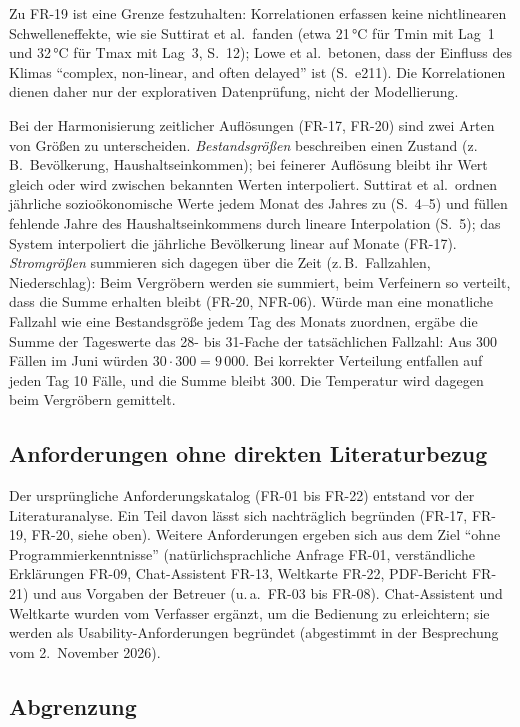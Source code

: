 \documentclass[11pt,a4paper]{article}
\begin{document}
\noindent Zu FR-19 ist eine Grenze festzuhalten: Korrelationen erfassen keine
nichtlinearen Schwelleneffekte, wie sie Suttirat et al.\ fanden (etwa
21\,°C für Tmin mit Lag~1 und 32\,°C für Tmax mit Lag~3, S.~12); Lowe et al.\
betonen, dass der Einfluss des Klimas \enquote{complex, non-linear, and often
delayed} ist (S.~e211). Die Korrelationen dienen daher nur der explorativen
Datenprüfung, nicht der Modellierung.

\noindent Bei der Harmonisierung zeitlicher Auflösungen (FR-17, FR-20) sind zwei
Arten von Größen zu unterscheiden. \emph{Bestandsgrößen} beschreiben einen Zustand
(z.\,B.\ Bevölkerung, Haushaltseinkommen); bei feinerer Auflösung bleibt ihr Wert
gleich oder wird zwischen bekannten Werten interpoliert. Suttirat et al.\ ordnen
jährliche sozioökonomische Werte jedem Monat des Jahres zu (S.~4--5) und füllen
fehlende Jahre des Haushaltseinkommens durch lineare Interpolation (S.~5); das
System interpoliert die jährliche Bevölkerung linear auf Monate (FR-17).
\emph{Stromgrößen} summieren sich dagegen über die Zeit (z.\,B.\ Fallzahlen,
Niederschlag): Beim Vergröbern werden sie summiert, beim Verfeinern so verteilt,
dass die Summe erhalten bleibt (FR-20, NFR-06). Würde man eine monatliche Fallzahl
wie eine Bestandsgröße jedem Tag des Monats zuordnen, ergäbe die Summe der
Tageswerte das 28- bis 31-Fache der tatsächlichen Fallzahl: Aus 300 Fällen im Juni
würden $30 \cdot 300 = 9\,000$. Bei korrekter Verteilung entfallen auf jeden Tag
10 Fälle, und die Summe bleibt 300. Die Temperatur wird dagegen beim Vergröbern
gemittelt.

\subsection{Anforderungen ohne direkten Literaturbezug}

Der ursprüngliche Anforderungskatalog (FR-01 bis FR-22) entstand vor der
Literaturanalyse. Ein Teil davon lässt sich nachträglich begründen (FR-17,
FR-19, FR-20, siehe oben). Weitere Anforderungen ergeben sich aus dem Ziel
\enquote{ohne Programmierkenntnisse} (natürlichsprachliche Anfrage FR-01,
verständliche Erklärungen FR-09, Chat-Assistent FR-13, Weltkarte FR-22,
PDF-Bericht FR-21) und aus Vorgaben der Betreuer (u.\,a.\ FR-03 bis FR-08).
Chat-Assistent und Weltkarte wurden vom Verfasser ergänzt, um die Bedienung zu
erleichtern; sie werden als Usability-Anforderungen begründet (abgestimmt in der
Besprechung vom 2.~November 2026).

\subsection{Abgrenzung}
\end{document}
